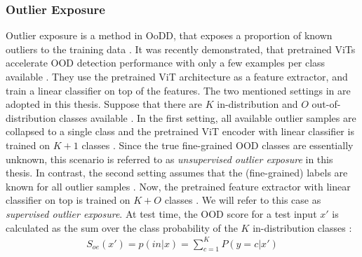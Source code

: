 \subsubsection{Outlier Exposure}
Outlier exposure is a method in OoDD, that exposes a proportion of known outliers to the training data \citep{Hendrycks2018}.
It was recently demonstrated, that pretrained ViTs accelerate OOD detection performance with only a few examples per class available \citep{Fort2021}.
They use the pretrained ViT architecture as a feature extractor, and train a linear classifier on top of the features.
The two mentioned settings in \citep{Fort2021} are adopted in this thesis.
Suppose that there are $K$ in-distribution and $O$ out-of-distribution classes available \citep{Fort2021}.
In the first setting, all available outlier samples are collapsed to a single class and the pretrained ViT encoder with linear classifier is trained on $K+1$ classes \citep{Fort2021,Thulasidasan2021}.
Since the true fine-grained OOD classes are essentially unknown, this scenario is referred to as \textit{unsupervised outlier exposure}  in this thesis.
In contrast, the second setting assumes that the (fine-grained) labels are known for all outlier samples \citep{Fort2021,Roy2021}.
Now, the pretrained feature extractor with linear classifier on top is trained on $K+O$ classes \citep{Fort2021}.
We will refer to this case as \textit{supervised outlier exposure}.
At test time, the OOD score for a test input $x'$ is calculated as the sum over the class probability of the $K$ in-distribution classes \citep{Fort2021}:
\begin{align}
	S_{oe}(x') = p(in|x) = \sum_{c=1}^{K}P(y=c|x') 
\end{align}
